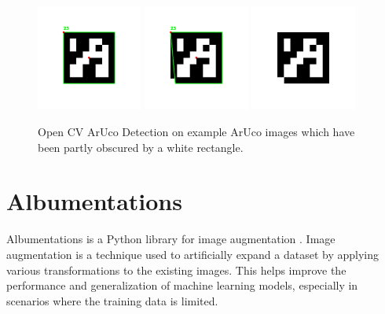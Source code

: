 \documentclass[10pt]{book}
\begin{document}
\begin{figure}
  \centering
     {\includegraphics[width=0.31\textwidth]{image/rec}}
     {\includegraphics[width=0.31\textwidth]{image/skewed-rec}}
     {\includegraphics[width=0.31\textwidth]{image/no-rec}}
  \caption{Open CV ArUco Detection on example \ac{ArUco} images which have been partly obscured by a white rectangle.}
  \label{fig:aruco-det}
\end{figure}

\section{Albumentations}

Albumentations is a Python library for image augmentation \cite{info11020125}. Image augmentation is a technique used to artificially expand a dataset by applying various transformations to the existing images. This helps improve the performance and generalization of machine learning models, especially in scenarios where the training data is limited. 
\end{document}
